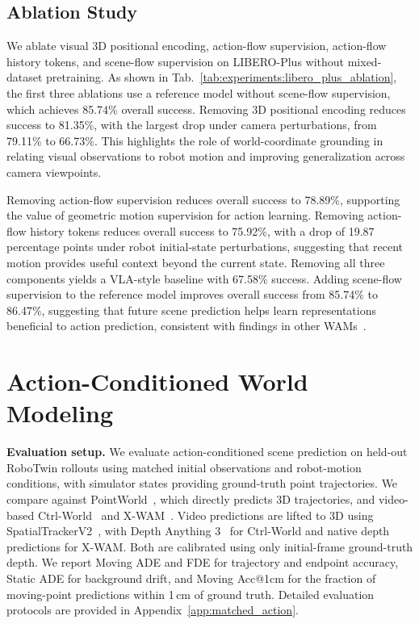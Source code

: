 \vspace{-0.2cm}

\subsection{Ablation Study}
\label{sec:experiments:ablations}
\vspace{-0.2cm}

We ablate visual 3D positional encoding, action-flow supervision,
action-flow history tokens, and scene-flow supervision on LIBERO-Plus without
mixed-dataset pretraining.
As shown in Tab.~\ref{tab:experiments:libero_plus_ablation},
the first three ablations use a reference model without scene-flow
supervision, which achieves 85.74\% overall success.
Removing 3D positional encoding reduces success to 81.35\%,
with the largest drop under camera perturbations, from 79.11\%
to 66.73\%. This highlights the role of world-coordinate grounding
in relating visual observations to robot motion and improving
generalization across camera viewpoints.

Removing action-flow supervision reduces overall success to 78.89\%,
supporting the value of geometric motion supervision for action
learning.
Removing action-flow history tokens reduces overall success to 75.92\%,
with a drop of 19.87 percentage points under robot initial-state
perturbations, suggesting that recent motion provides useful context
beyond the current state.
Removing all three components yields a VLA-style baseline with
67.58\% success. Adding scene-flow supervision to the reference model improves overall
success from 85.74\% to 86.47\%, suggesting that future scene prediction
helps learn representations beneficial to action prediction, consistent
with findings in other WAMs~\citep{yuan2026fastwam}.


\vspace{-0.3cm}

\section{Action-Conditioned World Modeling}
\label{sec:experiments:world_model}
\vspace{-0.2cm}

\noindent\textbf{Evaluation setup.}
We evaluate action-conditioned scene prediction on held-out RoboTwin
rollouts using matched initial observations and robot-motion conditions,
with simulator states providing ground-truth point trajectories.
We compare against PointWorld~\citep{huang2026pointworld}, which directly
predicts 3D trajectories, and video-based Ctrl-World~\citep{ctrlworld}
and X-WAM~\citep{guo2026xwam}. Video predictions are lifted to 3D using
SpatialTrackerV2~\citep{xiao2025spatialtrackerv2}, with
Depth Anything 3~\citep{lin2025depthanything3} for Ctrl-World and native
depth predictions for X-WAM. Both are calibrated using only initial-frame
ground-truth depth.
We report Moving ADE and FDE for trajectory and endpoint accuracy,
Static ADE for background drift, and Moving Acc@1cm for the fraction
of moving-point predictions within 1\,cm of ground truth.
Detailed evaluation protocols are provided in Appendix~\ref{app:matched_action}.

